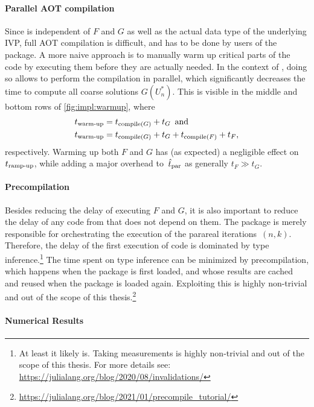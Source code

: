 \paragraph{Parallel \acs{AOT} compilation}

Since  is independent of $F$ and $G$ as well as the actual data type of the underlying \ac{IVP},
full \ac{AOT} compilation is difficult, and has to be done by users of the package.
A more naive approach is to manually warm up critical parts of the code by executing them before they are actually needed.
In the context of ,
doing so allows to perform the compilation in parallel,
which significantly decreases the time to compute all coarse solutions $G(U_n^*)$.
This is visible in the middle and bottom rows of \autoref{fig:impl:warmup},
where
\begin{align*}
  t_\text{warm-up} &= t_{\operatorname{compile}(G)} + t_G
  \enspace
  \text{and} \\
  t_\text{warm-up} &= t_{\operatorname{compile}(G)} + t_G + t_{\operatorname{compile}(F)} + t_F,
\end{align*}
respectively.
Warming up both $F$ and $G$ has (as expected) a negligible effect on~$t_\text{ramp-up}$,
while adding a major overhead to~$\hat t_\text{par}$ as generally $t_F \gg t_G$.

\paragraph{Precompilation}

Besides reducing the delay of executing $F$ and $G$,
it is also important to reduce the delay of any code from  that does not depend on them.
The package is merely responsible for orchestrating the execution of the parareal iterations~$(n,k)$.
Therefore, the delay of the first execution of  code is dominated by type inference.\footnote{%
  At least it likely is. Taking measurements is highly non-trivial and out of the scope of this thesis.
  For more details see: \url{https://julialang.org/blog/2020/08/invalidations/}
}
The time spent on type inference can be minimized by precompilation,
which happens when the package is first loaded,
and whose results are cached and reused when the package is loaded again.
Exploiting this is highly non-trivial and out of the scope of this thesis.\footnote{\url{https://julialang.org/blog/2021/01/precompile_tutorial/}}

\paragraph{Numerical Results}

